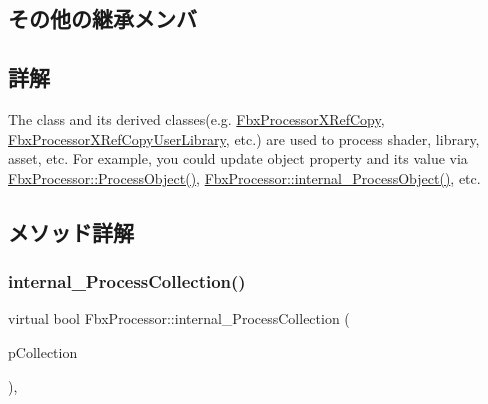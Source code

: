 \subsection*{その他の継承メンバ}


\subsection{詳解}
The class and its derived classes(e.\+g. \hyperlink{class_fbx_processor_x_ref_copy}{Fbx\+Processor\+X\+Ref\+Copy}, \hyperlink{class_fbx_processor_x_ref_copy_user_library}{Fbx\+Processor\+X\+Ref\+Copy\+User\+Library}, etc.) are used to process shader, library, asset, etc. For example, you could update object property and its value via \hyperlink{class_fbx_processor_adb5587b39465b31d968f1ba7dd2b2d5f}{Fbx\+Processor\+::\+Process\+Object()}, \hyperlink{class_fbx_processor_ac549e7e8c678383831be8789a7c4ccdb}{Fbx\+Processor\+::internal\+\_\+\+Process\+Object()}, etc. 

\subsection{メソッド詳解}
\mbox{\label{class_fbx_processor_a0b0b24fc89c90b8cc6149df1360fbcbd}} 
\subsubsection{\texorpdfstring{internal\+\_\+\+Process\+Collection()}{internal\_ProcessCollection()}}
{\footnotesize\ttfamily virtual bool Fbx\+Processor\+::internal\+\_\+\+Process\+Collection (\begin{DoxyParamCaption}\item[{\hyperlink{class_fbx_collection}{Fbx\+Collection} $\ast$}]{p\+Collection }\end{DoxyParamCaption})\hspace{0.3cm}{\ttfamily [protected]}, {\ttfamily [virtual]}}

\mbox{\label{class_fbx_processor_aae65d06b0e0f7865eaaa803a4009d536}} 
